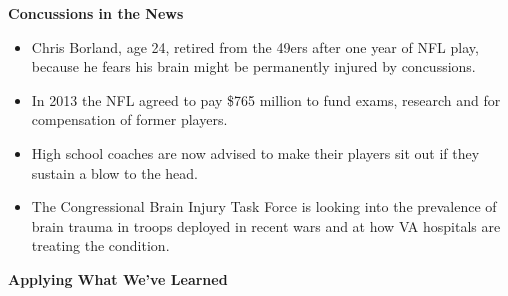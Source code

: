 \def\theTopic{Effects of Concussion }
\def\dayNum{27 }

\begin{center}
{\bf {\large Concussions in the News}}\\
\end{center}

\begin{itemize}
\item 
Chris Borland, age 24,  retired from the 49ers after one year of
NFL play, because he fears his brain might be permanently injured by
concussions.
\item In 2013 the NFL agreed to pay \$765 million to fund exams,
  research and for compensation of former players.
\item High school coaches are now advised to make their
  players sit out if they sustain a blow to the head. 
\item The Congressional Brain Injury Task Force is looking into 
  the prevalence of brain trauma in troops deployed in recent wars and
  at how VA hospitals are treating the condition.
\end{itemize}

\begin{center}
  {\large\bf Applying What We've Learned}
\end{center}


